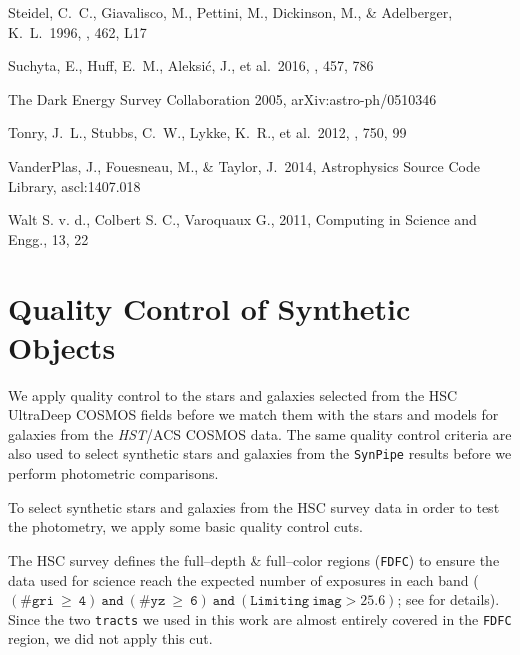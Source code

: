 \documentclass[useamsfonts]{pasj01}
\def\synpipe{\texttt{SynPipe}}
\def\tracts{\texttt{tracts}}
\def\hst{{\textit{HST}}}
\begin{document}
\begin{thebibliography}{}
     Steidel, C.~C., Giavalisco, M.,
             Pettini, M., Dickinson, M., \& Adelberger, K.~L.\ 1996, \apjl, 462, L17

     Suchyta, E., Huff, E.~M., Aleksi{\'c},
             J., et al.\ 2016, \mnras, 457, 786

     The Dark Energy
             Survey Collaboration 2005, arXiv:astro-ph/0510346

     Tonry, J.~L., Stubbs, C.~W., Lykke, K.~R.,
             et al.\ 2012, \apj, 750, 99

     VanderPlas, J., Fouesneau, M., \&
             Taylor, J.\ 2014, Astrophysics Source Code Library, ascl:1407.018

     Walt S. v. d., Colbert S. C., Varoquaux G.,
             2011, Computing in Science and Engg., 13, 22

\end{thebibliography}


\appendix
\section{Quality Control of Synthetic Objects}
    \label{app:qc}

    We apply quality control to the stars and galaxies selected from the HSC UltraDeep
    COSMOS fields before we match them with the stars and models for galaxies from the 
    \hst/ACS COSMOS data. 
    The same quality control criteria are also used to select synthetic stars and 
    galaxies from the \synpipe{} results before we perform photometric comparisons. 
    
    To select synthetic stars and galaxies from the HSC survey data in order to test
    the photometry, we apply some basic quality control cuts.

    The HSC survey defines the full--depth \& full--color regions (\texttt{FDFC}) to
    ensure the data used for science reach the expected number of exposures in each
    band
    ($\mathtt{(\#gri\ \geq\ 4)\ and\ (\#yz\ \geq\ 6)\ and\ (Limiting\ imag> 25.6)}$;
    see \citealt{HSCDR1} for details).
    Since the two \tracts{} we used in this work are almost entirely covered in
    the \texttt{FDFC} region, we did not apply this cut.
    
\end{document}
